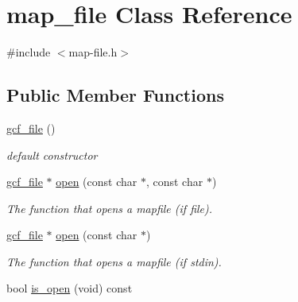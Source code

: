 \hypertarget{classmap__file}{\section{map\-\_\-file Class Reference}
\label{classmap__file}
}


{\ttfamily \#include $<$map-\/file.\-h$>$}

\subsection*{Public Member Functions}
\begin{DoxyCompactItemize}
\item 
\hypertarget{classmap__file_aca4db854f13eafc3cd56d11554d5af8d}{\hyperlink{classmap__file_aca4db854f13eafc3cd56d11554d5af8d}{gcf\-\_\-file} ()}\label{classmap__file_aca4db854f13eafc3cd56d11554d5af8d}

\begin{DoxyCompactList}\small\item\em default constructor \end{DoxyCompactList}\item 
\hypertarget{classmap__file_ab724cbd44a269ae57f97d9e6bc6c248c}{\hyperlink{classmap__file_aca4db854f13eafc3cd56d11554d5af8d}{gcf\-\_\-file} $\ast$ \hyperlink{classmap__file_ab724cbd44a269ae57f97d9e6bc6c248c}{open} (const char $\ast$, const char $\ast$)}\label{classmap__file_ab724cbd44a269ae57f97d9e6bc6c248c}

\begin{DoxyCompactList}\small\item\em The function that opens a mapfile (if file). \end{DoxyCompactList}\item 
\hypertarget{classmap__file_a8bcc446fc7cf527825fbe63fc796c8e6}{\hyperlink{classmap__file_aca4db854f13eafc3cd56d11554d5af8d}{gcf\-\_\-file} $\ast$ \hyperlink{classmap__file_a8bcc446fc7cf527825fbe63fc796c8e6}{open} (const char $\ast$)}\label{classmap__file_a8bcc446fc7cf527825fbe63fc796c8e6}

\begin{DoxyCompactList}\small\item\em The function that opens a mapfile (if stdin). \end{DoxyCompactList}\item 
\hypertarget{classmap__file_aebcd1e9cdab2fc3efa53ac7de32d6730}{bool \hyperlink{classmap__file_aebcd1e9cdab2fc3efa53ac7de32d6730}{is\-\_\-open} (void) const }\label{classmap__file_aebcd1e9cdab2fc3efa53ac7de32d6730}


\end{DoxyCompactItemize}
